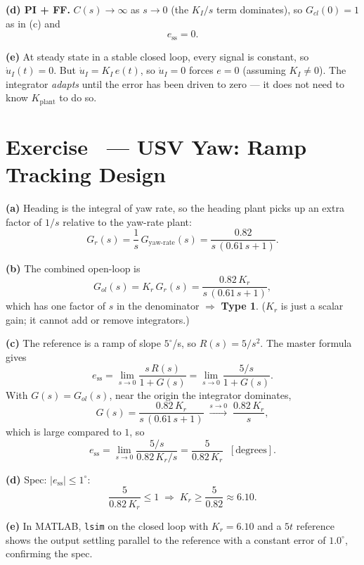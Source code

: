 \documentclass[11pt]{article}
\newcounter{exercise}
\newcommand{\exercise}[1]{%
  \refstepcounter{exercise}%
  \section*{Exercise \theexercise\ --- #1}%
}
\begin{document}
\textbf{(d) PI + FF.}  $C(s) \to \infty$ as $s \to 0$ (the $K_I/s$ term
dominates), so $G_{cl}(0) = 1$ as in (c) and
\[
  e_\mathrm{ss} = \boxed{0}.
\]

\textbf{(e)}  At steady state in a stable closed loop, every signal is
constant, so $\dot{u}_I(t) = 0$.  But $\dot{u}_I = K_I\,e(t)$, so
$\dot{u}_I = 0$ forces $e = 0$ (assuming $K_I \neq 0$).  The integrator
\emph{adapts} until the error has been driven to zero --- it does not need
to know $K_\mathrm{plant}$ to do so.

\exercise{USV Yaw: Ramp Tracking Design}

\textbf{(a)}  Heading is the integral of yaw rate, so the heading plant
picks up an extra factor of $1/s$ relative to the yaw-rate plant:
\[
  G_r(s) = \frac{1}{s}\,G_\mathrm{yaw\text{-}rate}(s)
         = \frac{0.82}{s\,(0.61\,s + 1)}.
\]

\textbf{(b)}  The combined open-loop is
\[
  G_{ol}(s) = K_r\,G_r(s) = \frac{0.82\,K_r}{s\,(0.61\,s + 1)},
\]
which has one factor of $s$ in the denominator $\Rightarrow$ \textbf{Type 1}.
($K_r$ is just a scalar gain; it cannot add or remove integrators.)

\textbf{(c)}  The reference is a ramp of slope $5^\circ$/s, so $R(s) =
5/s^2$.  The master formula gives
\[
  e_\mathrm{ss} = \lim_{s \to 0} \frac{s\,R(s)}{1 + G(s)}
                = \lim_{s \to 0} \frac{5/s}{1 + G(s)}.
\]
With $G(s) = G_{ol}(s)$, near the origin the integrator dominates,
\[
  G(s) = \frac{0.82\,K_r}{s\,(0.61\,s + 1)}
       \;\xrightarrow{s \to 0}\;
       \frac{0.82\,K_r}{s},
\]
which is large compared to $1$, so
\[
  e_\mathrm{ss} = \lim_{s \to 0} \frac{5/s}{0.82\,K_r/s}
                = \frac{5}{0.82\,K_r} \;\;[\text{degrees}].
\]

\textbf{(d)}  Spec: $|e_\mathrm{ss}| \le 1^\circ$:
\[
  \frac{5}{0.82\,K_r} \le 1
  \;\Longrightarrow\;
  K_r \ge \frac{5}{0.82}
        \approx \boxed{6.10}.
\]

\textbf{(e)}  In MATLAB, \texttt{lsim} on the closed loop with $K_r = 6.10$
and a $5t$ reference shows the output settling parallel to the reference
with a constant error of $1.0^\circ$, confirming the spec.
\end{document}
